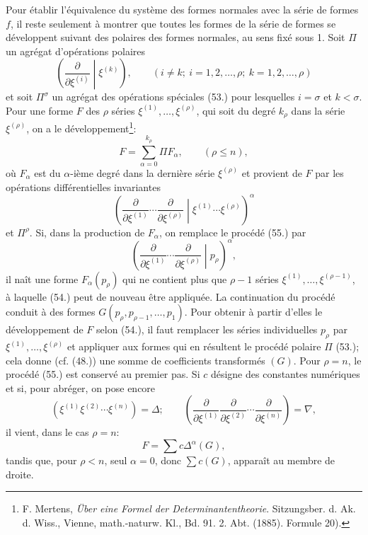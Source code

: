 \documentclass[11pt]{article}
\begin{document}
Pour établir l'équivalence du système des formes normales avec la série de formes $f$, il reste seulement à montrer que toutes les formes de la série de formes se développent suivant des polaires des formes normales, au sens fixé sous 1. Soit $\Pi$ un agrégat d'opérations polaires
\begin{equation}
 \left(\frac{\partial}{\partial\xi^{(i)}}\middle|\xi^{(k)}\right),
 \qquad (i\ne k;\ i=1,2,\ldots,\rho;\ k=1,2,\ldots,\rho)
\tag{53}
\end{equation}
et soit $\Pi^\sigma$ un agrégat des opérations spéciales (53.) pour lesquelles $i=\sigma$ et $k<\sigma$. Pour une forme $F$ des $\rho$ séries $\xi^{(1)},\ldots,\xi^{(\rho)}$, qui soit du degré $k_\rho$ dans la série $\xi^{(\rho)}$, on a le développement\footnote{F. Mertens, \emph{Über eine Formel der Determinantentheorie}. Sitzungsber. d. Ak. d. Wiss., Vienne, math.-naturw. Kl., Bd. 91. 2. Abt. (1885). Formule 20).}:
\begin{equation}
 F=\sum_{\alpha=0}^{k_\rho}\Pi F_\alpha,
 \qquad(\rho\le n),
\tag{54}
\end{equation}
où $F_\alpha$ est du $\alpha$-ième degré dans la dernière série $\xi^{(\rho)}$ et provient de $F$ par les opérations différentielles invariantes
\begin{equation}
 \left(\frac{\partial}{\partial\xi^{(1)}}\cdots\frac{\partial}{\partial\xi^{(\rho)}}\middle|\xi^{(1)}\cdots\xi^{(\rho)}\right)^\alpha
\tag{55}
\end{equation}
et $\Pi^\rho$. Si, dans la production de $F_\alpha$, on remplace le procédé (55.) par
\begin{equation}
 \left(\frac{\partial}{\partial\xi^{(1)}}\cdots\frac{\partial}{\partial\xi^{(\rho)}}\middle|p_\rho\right)^\alpha,
\tag{56}
\end{equation}
il naît une forme $F_\alpha(p_\rho)$ qui ne contient plus que $\rho-1$ séries $\xi^{(1)},\ldots,\xi^{(\rho-1)}$, à laquelle (54.) peut de nouveau être appliquée. La continuation du procédé conduit à des formes $G(p_\rho,p_{\rho-1},\ldots,p_1)$. Pour obtenir à partir d'elles le développement de $F$ selon (54.), il faut remplacer les séries individuelles $p_\rho$ par $\xi^{(1)},\ldots,\xi^{(\rho)}$ et appliquer aux formes qui en résultent le procédé polaire $\Pi$ (53.); cela donne (cf. (48.)) une somme de coefficients transformés $(G)$. Pour $\rho=n$, le procédé (55.) est conservé au premier pas. Si $c$ désigne des constantes numériques et si, pour abréger, on pose encore
\begin{equation}
 (\xi^{(1)}\xi^{(2)}\cdots\xi^{(n)})=\Delta;
 \qquad
 \left(\frac{\partial}{\partial\xi^{(1)}}\frac{\partial}{\partial\xi^{(2)}}\cdots\frac{\partial}{\partial\xi^{(n)}}\right)=\nabla,
\tag{57}
\end{equation}
il vient, dans le cas $\rho=n$:
\begin{equation}
 F=\sum c\Delta^\alpha(G),
\tag{58}
\end{equation}
tandis que, pour $\rho<n$, seul $\alpha=0$, donc $\sum c(G)$, apparaît au membre de droite.
\end{document}

